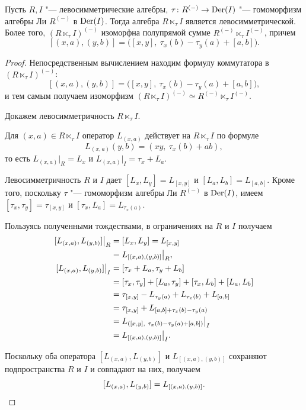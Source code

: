 \documentclass[a4paper,14pt,oneside,openany]{memoir}
\begin{document}
\begin{theorem}\label{th:semidirect-pre-lie}
    Пусть $R,I$ "--- левосимметрические алгебры, $\tau\colon R^{(-)}\to\operatorname{Der}(I)$
    "--- гомоморфизм алгебры Ли $R^{(-)}$ в $\operatorname{Der}(I)$. Тогда алгебра
    $R\ltimes_{\tau} I$ является левосимметрической. Более того, $(R\ltimes_{\tau}
    I)^{(-)}$ изоморфна полупрямой сумме $R^{(-)}\ltimes_\tau I^{(-)}$, причем
    \[
        [(x,a),(y,b)]=\bigl([x,y],\ \tau_x(b)-\tau_y(a)+[a,b]\bigr).
    \]
\end{theorem}
\begin{proof}
    Непосредственным вычислением находим формулу коммутатора в $(R\ltimes_{\tau}
    I)^{(-)}$:
    \[
        [(x,a),(y,b)]=\bigl([x,y],\ \tau_x(b)-\tau_y(a)+[a,b]\bigr),
    \]
    и тем самым получаем изоморфизм $(R\ltimes_{\tau} I)^{(-)} \simeq
    R^{(-)}\ltimes_\tau I^{(-)}$.

    \medskip

    Докажем левосимметричность $R\ltimes_{\tau} I$.

    \medskip

    Для $(x,a) \in R\ltimes_{\tau} I$ оператор $L_{(x,a)}$ действует на
    $R\ltimes_{\tau} I$ по формуле
    \[
        L_{(x,a)}(y,b)=(xy,\ \tau_x(b)+ab),
    \]
    то есть $L_{(x,a)}|_R = L_x$ и $L_{(x,a)}|_I = \tau_x+L_a$.

    Левосимметричность $R$ и $I$ дает $[L_x,L_y]=L_{[x,y]}$ и
    $[L_a,L_b]=L_{[a,b]}$. Кроме того, поскольку $\tau$ "--- гомоморфизм алгебры Ли
    $R^{(-)}$ в $\operatorname{Der}(I)$, имеем $[\tau_x,\tau_y]=\tau_{[x,y]}$ и
    $[\tau_x,L_a]=L_{\tau_x(a)}$.

    Пользуясь полученными тождествами, в ограничениях на $R$ и $I$ получаем
    \begin{align*}
        \restr{[L_{(x,a)}, L_{(y,b)}]}{R}
         & = [L_x, L_y] = L_{[x,y]}                                        \\
         & = \restr{L_{[(x,a),(y,b)]}}{R},                                 \\
        \restr{[L_{(x,a)}, L_{(y,b)}]}{I}
         & = [\tau_x + L_a, \tau_y + L_b]                                  \\
         & = [\tau_x, \tau_y] + [L_a, \tau_y] + [\tau_x, L_b] + [L_a, L_b] \\
         & = \tau_{[x,y]} - L_{\tau_y(a)} + L_{\tau_x(b)} + L_{[a,b]}      \\
         & = \tau_{[x,y]} + L_{[a,b] + \tau_x(b) - \tau_y(a)}              \\
         & = \restr{L_{([x,y],\ \tau_x(b) - \tau_y(a) + [a,b])}}{I}        \\
         & = \restr{L_{[(x,a),(y,b)]}}{I}.
    \end{align*}

    Поскольку оба оператора $[L_{(x,a)}, L_{(y,b)}]$ и $L_{[(x,a),(y,b)]}$
    сохраняют подпространства $R$ и $I$ и совпадают на них, получаем
    \[
        [L_{(x,a)},L_{(y,b)}]=L_{[(x,a),(y,b)]}.\qedhere
    \]
\end{proof}
\end{document}
